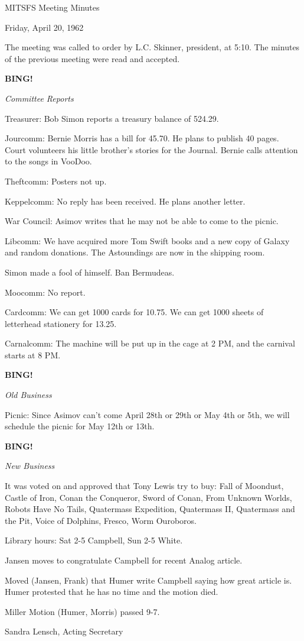 \documentclass[12pt]{article}
\newcommand{\bing}{{\bf BING!} }
\newcommand{\goto}[1]{\bing \vskip 12pt \centerline{{\em{#1}}}}
\begin{document}
\begin{center}

MITSFS Meeting Minutes

Friday, April 20, 1962

\end{center}
 
\vspace{12pt}

\setlength{\parskip}{6pt}

\noindent
The meeting was called to order by L.C. Skinner, president, at 5:10. The minutes of the previous meeting were read and accepted.

\goto{Committee Reports}

Treasurer: Bob Simon reports a treasury balance of 524.29.

Jourcomm: Bernie Morris has a bill for 45.70. He plans to publish 40 pages. Court volunteers his little brother's stories for the Journal. Bernie calls attention to the songs in VooDoo.

Theftcomm: Posters not up.

Keppelcomm: No reply has been received. He plans another letter.

War Council: Asimov writes that he may not be able to come to the picnic.

Libcomm: We have acquired more Tom Swift books and a new copy of Galaxy and random donations. The Astoundings are now in the shipping room.

Simon made a fool of himself. Ban Bermudeas.

Moocomm: No report.

Cardcomm: We can get 1000 cards for 10.75. We can get 1000 sheets of letterhead stationery for 13.25.

Carnalcomm: The machine will be put up in the cage at 2 PM, and the carnival starts at 8 PM.

\goto{Old Business}

Picnic: Since Asimov can't come April 28th or 29th or May 4th or 5th, we will schedule the picnic for May 12th or 13th.

\goto{New Business}

It was voted on and approved that Tony Lewis try to buy: Fall of Moondust, Castle of Iron, Conan the Conqueror, Sword of Conan, From Unknown Worlds, Robots Have No Tails, Quatermass Expedition, Quatermass II, Quatermass and the Pit, Voice of Dolphins, Fresco, Worm Ouroboros.

Library hours: Sat 2-5 Campbell, Sun 2-5 White.

Jansen moves to congratulate Campbell for recent Analog article.

Moved (Jansen, Frank) that Humer write Campbell saying how great article is. Humer protested that he has no time and the motion died.

Miller Motion (Humer, Morris) passed 9-7.

\vspace{12pt}

\centerline{Sandra Lensch, Acting Secretary}
\end{document}
